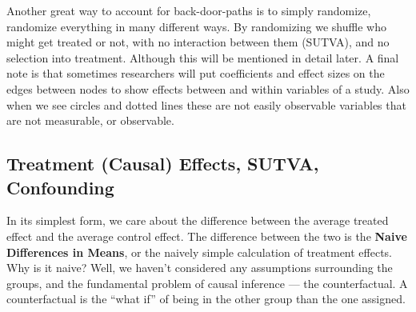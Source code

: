 \documentclass[12pt]{article}\usepackage[]{graphicx}\usepackage[]{color}
\begin{document}
\begin{flushleft}
Another great way to account for back-door-paths is to simply randomize, randomize everything in many different ways. By randomizing we shuffle who might get treated or not, with no interaction between them (SUTVA), and no selection into treatment. Although this will be mentioned in detail later. A final note is that sometimes researchers will put coefficients and effect sizes on the edges between nodes to show effects between and within variables of a study. Also when we see circles and dotted lines these are not easily observable variables that are not measurable, or observable.


\begin{center}
\end{center}





\subsection{Treatment (Causal) Effects, SUTVA, Confounding}

In its simplest form, we care about the difference between the average treated effect and the average control effect. The difference between the two is the \textbf{Naive Differences in Means}, or the naively simple calculation of treatment effects. Why is it naive? Well, we haven't considered any assumptions surrounding the groups, and the fundamental problem of causal inference --- the counterfactual. A counterfactual is the ``what if'' of being in the other group than the one assigned. 


\end{flushleft}
\end{document}
